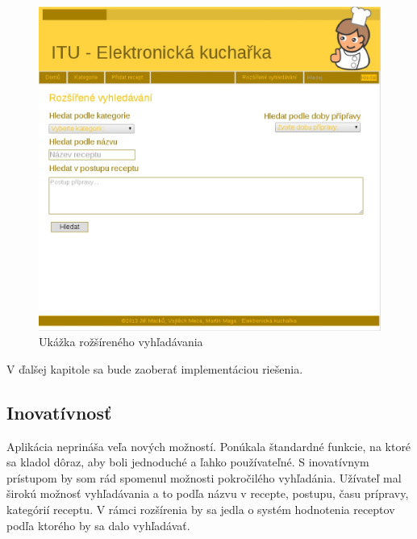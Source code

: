 \documentclass[12pt,a4paper,titlepage,final]{article}
\begin{document}
\begin{figure}
\begin{center}

\includegraphics[scale=0.7]{img/extendedsearch.eps} 
\caption{Ukážka rožšíreného vyhľadávania}


\end{center}

\end{figure}


 V ďalšej kapitole sa bude zaoberať implementáciou riešenia. 

\subsection{Inovatívnosť}
Aplikácia neprináša veľa nových možností. Ponúkala štandardné funkcie, na ktoré sa kladol dôraz, aby boli jednoduché a ľahko používateľné. S inovatívnym prístupom by som rád spomenul možnosti pokročilého vyhľadánia. Užívateľ mal širokú možnosť vyhľadávania a to podľa názvu v recepte, postupu, času prípravy, kategórií receptu. V rámci rozšírenia by sa jedla o systém hodnotenia receptov podľa ktorého by sa dalo vyhľadávať.
\end{document}
